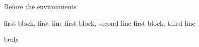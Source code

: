 Before the environments
\begin{one}
	first block, first line
	first block, second line
	first block, third line
\begin{two}
	body
\end{two}
\end{one}
